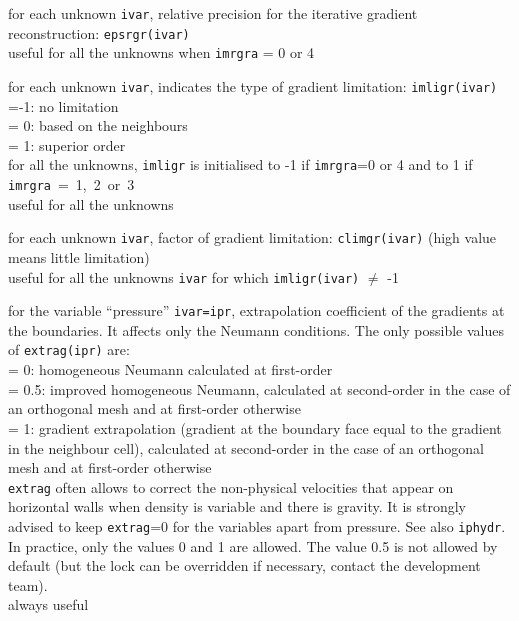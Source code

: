 {for each unknown {\tt ivar}, relative precision for the iterative gradient
reconstruction: {\tt epsrgr(ivar)}\\
useful for all the unknowns when {\tt imrgra} = 0 or 4}

{for each unknown {\tt ivar}, indicates the type of gradient limitation:
{\tt imligr(ivar)}\\
\hspace*{1.3cm}=-1: no limitation\\
\hspace*{1.3cm}= 0: based on the neighbours\\
\hspace*{1.3cm}= 1: superior order\\
for all the unknowns, {\tt imligr} is initialised to -1 if {\tt imrgra}=0 or 4
 and to 1 if \mbox{{\tt imrgra} = 1, 2 or 3}\\
useful for all the unknowns}

{for each unknown {\tt ivar}, factor of gradient limitation: {\tt climgr(ivar)}
(high value means little limitation)\\
useful for all the unknowns {\tt ivar} for which {\tt imligr(ivar)} $\ne$ -1}

{for the variable ``pressure'' {\tt ivar=ipr}, extrapolation coefficient
of the gradients at the boundaries. It affects only the Neumann conditions.
The only possible values of {\tt extrag(ipr)} are:\\
\hspace*{1.3cm}= 0: homogeneous Neumann calculated at first-order\\
\hspace*{1.3cm}= 0.5: improved homogeneous Neumann, calculated at
second-order in the case of an orthogonal mesh and at first-order otherwise\\
\hspace*{1.3cm}= 1: gradient extrapolation (gradient at the boundary face
equal to the gradient in the neighbour cell), calculated at
second-order in the case of an orthogonal mesh and at first-order otherwise\\
{\tt extrag} often allows to correct the non-physical velocities that
appear on horizontal walls when density is variable and there is gravity.
It is strongly advised to keep {\tt extrag}=0 for the variables apart from
pressure. See also {\tt iphydr}.\\
In practice, only the values 0 and 1 are allowed. The
value 0.5 is not allowed by default (but the lock can be overridden if
necessary, contact the development team).\\
always useful}

